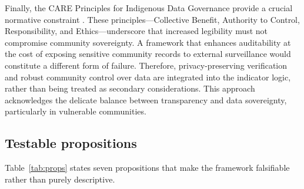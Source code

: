 \documentclass[sigconf]{acmart}
\begin{document}
Finally, the CARE Principles for Indigenous Data Governance provide a crucial normative constraint \cite{carroll2020}. These principles—Collective Benefit, Authority to Control, Responsibility, and Ethics—underscore that increased legibility must not compromise community sovereignty. A framework that enhances auditability at the cost of exposing sensitive community records to external surveillance would constitute a different form of failure. Therefore, privacy-preserving verification and robust community control over data are integrated into the indicator logic, rather than being treated as secondary considerations. This approach acknowledges the delicate balance between transparency and data sovereignty, particularly in vulnerable communities.

\subsection{Testable propositions}

Table~\ref{tab:props} states seven propositions that make the framework falsifiable rather than purely descriptive.
\end{document}
